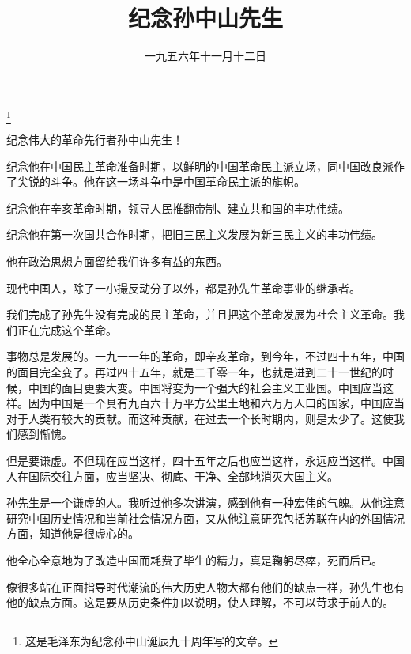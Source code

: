 
\title{纪念孙中山先生}
\date{一九五六年十一月十二日}
\thanks{这是毛泽东为纪念孙中山诞辰九十周年写的文章。}
\maketitle


纪念伟大的革命先行者孙中山先生！

纪念他在中国民主革命准备时期，以鲜明的中国革命民主派立场，同中国改良派作了尖锐的斗争。他在这一场斗争中是中国革命民主派的旗帜。

纪念他在辛亥革命时期，领导人民推翻帝制、建立共和国的丰功伟绩。

纪念他在第一次国共合作时期，把旧三民主义发展为新三民主义的丰功伟绩。

他在政治思想方面留给我们许多有益的东西。

现代中国人，除了一小撮反动分子以外，都是孙先生革命事业的继承者。

我们完成了孙先生没有完成的民主革命，并且把这个革命发展为社会主义革命。我们正在完成这个革命。

事物总是发展的。一九一一年的革命，即辛亥革命，到今年，不过四十五年，中国的面目完全变了。再过四十五年，就是二千零一年，也就是进到二十一世纪的时候，中国的面目更要大变。中国将变为一个强大的社会主义工业国。中国应当这样。因为中国是一个具有九百六十万平方公里土地和六万万人口的国家，中国应当对于人类有较大的贡献。而这种贡献，在过去一个长时期内，则是太少了。这使我们感到惭愧。

但是要谦虚。不但现在应当这样，四十五年之后也应当这样，永远应当这样。中国人在国际交往方面，应当坚决、彻底、干净、全部地消灭大国主义。

孙先生是一个谦虚的人。我听过他多次讲演，感到他有一种宏伟的气魄。从他注意研究中国历史情况和当前社会情况方面，又从他注意研究包括苏联在内的外国情况方面，知道他是很虚心的。

他全心全意地为了改造中国而耗费了毕生的精力，真是鞠躬尽瘁，死而后已。

像很多站在正面指导时代潮流的伟大历史人物大都有他们的缺点一样，孙先生也有他的缺点方面。这是要从历史条件加以说明，使人理解，不可以苛求于前人的。
